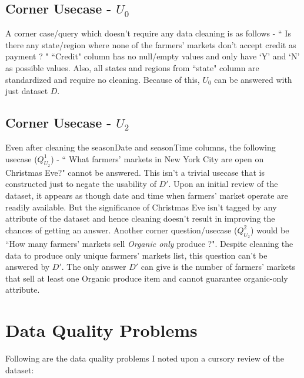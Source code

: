 \documentclass[10pt]{article}
\begin{document}
  

  
\subsection{Corner Usecase - $U_0$}
A corner case/query which doesn't require any data cleaning is as follows - `` Is there any state/region where none of the farmers' markets don't accept credit as payment ? " ``Credit" column has no null/empty values and only have `Y' and `N' as possible values. Also, all states and regions from ``state" column are standardized and require no cleaning. Because of this, $U_0$ can be answered with just dataset $D$. 
\subsection{Corner Usecase - $U_2$}
Even after cleaning the seasonDate and seasonTime columns, the following usecase ($Q^{1}_{U_2}$) - `` What farmers' markets in New York City are open on Christmas Eve?" cannot be answered. This isn't a trivial usecase that is constructed just to negate the usability of $D'$. Upon an initial review of the dataset, it appears as though date and time when farmers' market operate are readily available. But the significance of Christmas Eve isn't tagged by any attribute of the dataset and hence cleaning doesn't result in improving the chances of getting an answer. Another corner question/usecase ($Q^{2}_{U_2}$) would be ``How many farmers' markets sell \textit{Organic only} produce ?". Despite cleaning the data to produce only unique farmers' markets list, this question can't be answered by $D'$. The only answer $D'$ can give is the number of farmers' markets that sell at least one Organic produce item and cannot guarantee organic-only attribute.
   
\section{Data Quality Problems} \label{dq}
Following are the data quality problems I noted upon a cursory review of the dataset:
\end{document}
